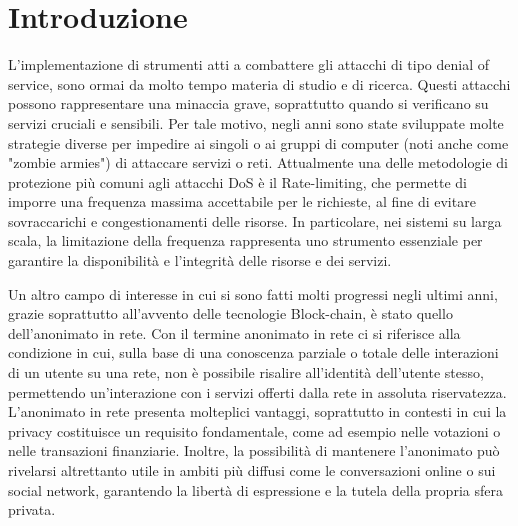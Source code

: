 \chapter*{Introduzione}

L’implementazione di strumenti atti a combattere gli attacchi di tipo denial of service, sono ormai da molto tempo materia di studio e di ricerca. Questi attacchi possono rappresentare una minaccia grave, soprattutto quando si verificano su servizi cruciali e sensibili. Per tale motivo, negli anni sono state sviluppate molte strategie diverse per impedire ai singoli o ai gruppi di computer (noti anche come "zombie armies") di attaccare servizi o reti. Attualmente una delle metodologie di protezione più comuni agli attacchi DoS è il Rate-limiting, che permette di imporre una frequenza massima accettabile per le richieste, al fine di evitare sovraccarichi e congestionamenti delle risorse. In particolare, nei sistemi su larga scala, la limitazione della frequenza rappresenta uno strumento essenziale per garantire la disponibilità e l'integrità delle risorse e dei servizi.\par

Un altro campo di interesse in cui si sono fatti molti progressi negli ultimi anni, grazie soprattutto all'avvento delle tecnologie Block-chain, è stato quello dell’anonimato in rete. Con il termine anonimato in rete ci si riferisce alla condizione in cui, sulla base di una conoscenza parziale o totale delle interazioni di un utente su una rete, non è possibile risalire all'identità dell'utente stesso, permettendo un'interazione con i servizi offerti dalla rete in assoluta riservatezza. L'anonimato in rete presenta molteplici vantaggi, soprattutto in contesti in cui la privacy costituisce un requisito fondamentale, come ad esempio nelle votazioni o nelle transazioni finanziarie. Inoltre, la possibilità di mantenere l'anonimato può rivelarsi altrettanto utile in ambiti più diffusi come le conversazioni online o sui social network, garantendo la libertà di espressione e la tutela della propria sfera privata.\par

